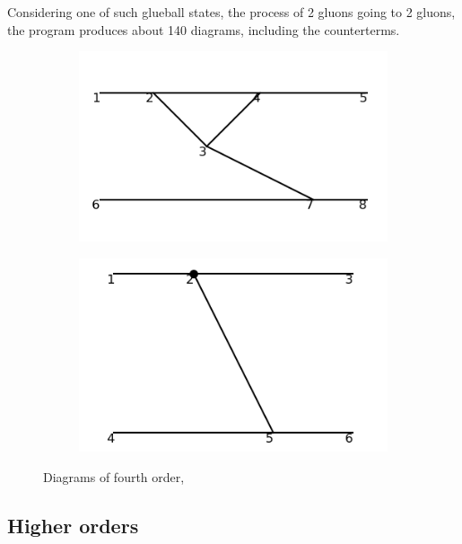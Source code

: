 \documentclass[11pt,a4paper,twoside,pdf]{article}
\numberwithin{equation}{section}
\begin{document}
Considering one of such glueball states, the process of 2 gluons going to 2 gluons, the program
produces about 140 diagrams, including the counterterms. 



\begin{figure}[h!]
    \centering
    \begin{subfigure}[t]{0.33\textwidth}
        \centering
        \includegraphics[width=\textwidth]{plots/order4/1.png}
        \caption{ }
    \end{subfigure}%
    \begin{subfigure}[t]{0.33\textwidth}
        \centering
        \includegraphics[width=\textwidth]{plots/order4/counterterms/1.png}
        \caption{ }
    \end{subfigure}
    \caption{Diagrams of fourth order,}
    \label{fig:order4/1}
\end{figure}

\newpage


\subsection{Higher orders}
\end{document}
